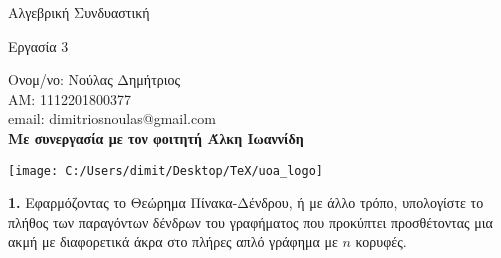 \documentclass[oneside,a4paper]{article}
\newcommand {\tl}{\textlatin}
\begin{document}
	
	
	\begin{framed}	
		\begin{center}
			\huge Αλγεβρική Συνδυαστική
		\end{center}
		\begin{center}
			\huge Εργασία 3
		\end{center}
		\vspace{0.3truecm}
		\begin{center}
			Ονομ/νο: Νούλας Δημήτριος\\
			ΑΜ: 1112201800377\\
			\tl{email}: \tl{dimitriosnoulas@gmail.com} \\
			\vspace{0.1cm}
			\textbf{Με συνεργασία με τον φοιτητή Άλκη Ιωαννίδη}
		\end{center}
		\vspace{0.3truecm}
	\end{framed}
	\vspace*{\fill}
	\begin{center}
	\texttt{[image: C:/Users/dimit/Desktop/TeX/uoa\_logo]}
	\end{center}
\vspace{1cm}
\pagebreak


\noindent \textbf{1.} Εφαρμόζοντας το Θεώρημα Πίνακα-Δένδρου, ή με άλλο τρόπο, υπολογίστε το πλήθος των παραγόντων δένδρων του γραφήματος που προκύπτει προσθέτοντας μια ακμή με διαφορετικά άκρα στο πλήρες απλό γράφημα με $n$ κορυφές.
\end{document}
